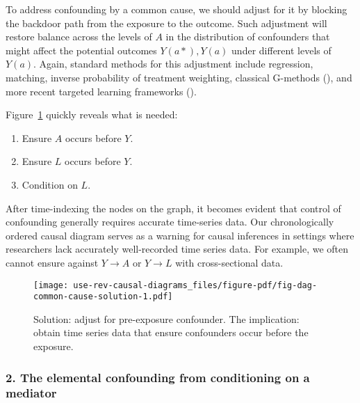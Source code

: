 \documentclass[
  singlecolumn,
  9pt]{article}
\providecommand{\tightlist}{%
  \setlength{\itemsep}{0pt}\setlength{\parskip}{0pt}}\usepackage{longtable,booktabs,array}
\begin{document}
To address confounding by a common cause, we should adjust for it by
blocking the backdoor path from the exposure to the outcome. Such
adjustment will restore balance across the levels of \(A\) in the
distribution of confounders that might affect the potential outcomes
\(Y(a*), Y(a)\) under different levels of \(Y(a)\). Again, standard
methods for this adjustment include regression, matching, inverse
probability of treatment weighting, classical G-methods
(), and more recent
targeted learning frameworks ().

Figure~\ref{fig-dag-common-cause-solution} quickly reveals what is
needed:

\begin{enumerate}
\def\labelenumi{\arabic{enumi}.}
\tightlist
\item
  Ensure \(A\) occurs before \(Y\).
\item
  Ensure \(L\) occurs before \(Y\).
\item
  Condition on \(L\).
\end{enumerate}

After time-indexing the nodes on the graph, it becomes evident that
control of confounding generally requires accurate time-series data. Our
chronologically ordered causal diagram serves as a warning for causal
inferences in settings where researchers lack accurately well-recorded
time series data. For example, we often cannot ensure against \(Y\to A\)
or \(Y \to L\) with cross-sectional data.

\begin{figure}

{\centering \texttt{[image: use-rev-causal-diagrams\_files/figure-pdf/fig-dag-common-cause-solution-1.pdf]}

}

\caption{\label{fig-dag-common-cause-solution}Solution: adjust for
pre-exposure confounder. The implication: obtain time series data that
ensure confounders occur before the exposure.}

\end{figure}

\subsubsection{2. The elemental confounding from conditioning on a
mediator}\label{the-elemental-confounding-from-conditioning-on-a-mediator}
\end{document}
